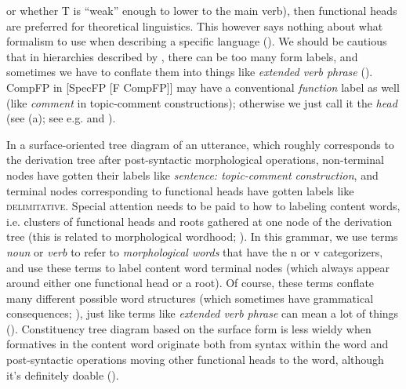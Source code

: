 \documentclass[UTF8, a4paper, oneside, scheme=plain, 12pt]{ctexrep}
\newcommand*{\citepages}[1]{pp.~{#1}}
\newcommand*{\term}[1]{\emph{#1}}
\newcommand{\form}[1]{\emph{#1}}
\newcommand*{\category}[1]{\textsc{#1}}
\begin{document}
{\begin{itemize}
{        or whether T is ``weak'' enough to lower to the main verb),
        then functional heads are preferred for theoretical linguistics.
        This however says nothing about what formalism to use 
        when describing a specific language ().
    }
    We should be cautious that in hierarchies described by \citet{cinque1999adverbs},
    there can be too many form labels,
    and sometimes we have to conflate them into things like \form{extended verb phrase}
    ().
    CompFP in [SpecFP [F CompFP]] may have a conventional \emph{function} label as well
    (like \form{comment} in topic-comment constructions);
    otherwise we just call it the \term{head} (see (a); see e.g.  and ).

    In a surface-oriented tree diagram of an utterance,
    which roughly corresponds to the derivation tree after post-syntactic morphological operations,
    non-terminal nodes have gotten their labels like \term{sentence: topic-comment construction},
    and terminal nodes corresponding to functional heads have gotten labels like \category{delimitative}.
    Special attention needs to be paid to how to labeling content words,
    i.e. clusters of functional heads and roots gathered at one node of the derivation tree
    (this is related to morphological wordhood; ).
    In this grammar, we use terms \term{noun} or \term{verb}
    to refer to \emph{morphological words} that have the n or v categorizers,
    and use these terms to label content word terminal nodes (which always appear around either one functional head or a root).
    Of course, these terms conflate many different possible word structures
    (which sometimes have grammatical consequences; \citealt[\citepages{59-60}]{siddiqi2009syntax}),
    just like terms like \term{extended verb phrase} can mean a lot of things
    ().
    Constituency tree diagram based on the surface form is
    less wieldy when formatives in the content word
    originate both from syntax within the word and post-syntactic operations moving 
    other functional heads to the word,
    although it's definitely doable ().
\end{itemize}

}
\end{document}
